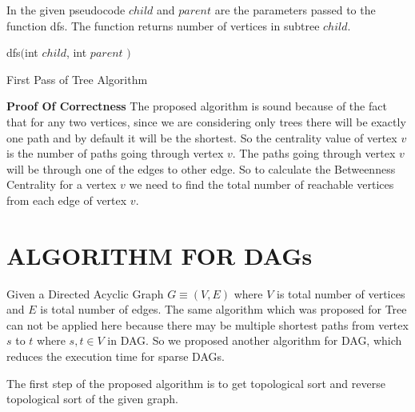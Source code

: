 \documentclass[MTech]{iitmdiss}
\begin{document}
In the given pseudocode $child$ and $parent$ are the parameters passed to the function dfs. The function returns number of vertices in subtree $child$. 

\begin{algorithm}
dfs$($int $child$, int $parent$ $)$ \\
\caption{First Pass of Tree Algorithm}
\end{algorithm}

\textbf{Proof Of Correctness}
The proposed algorithm is sound because of the fact that for any two vertices, since we are considering only trees there will be exactly one path and by default it will be the shortest. So the centrality value of vertex $v$ is the number of paths going through vertex $v$. The paths going through vertex $v$ will be through one of the edges to other edge. So to calculate the Betweenness Centrality for a vertex $v$ we need to find the total number of reachable vertices from each edge of vertex $v$.



\chapter{ALGORITHM FOR DAGs}

Given a Directed Acyclic Graph $G \equiv (V,E)$ where $V$ is total number of vertices and $E$ is total number of edges. The same algorithm which was proposed for Tree can not be applied here because there may be multiple shortest paths from vertex $s$ to $t$ where $s,t \in V$ in DAG. So we proposed another algorithm for DAG, which reduces the execution time for sparse DAGs.

The first step of the proposed algorithm is to get topological sort and reverse topological sort of the given graph.
\end{document}
